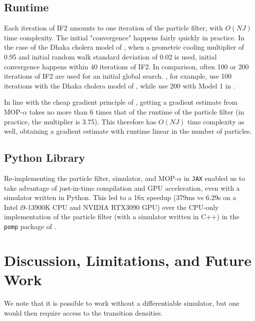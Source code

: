 \documentclass[9pt,twocolumn,twoside]{pnas-new}
\begin{document}
\subsection{Runtime}

Each iteration of IF2 amounts to one iteration of the particle filter, with $O(NJ)$ time complexity. The initial "convergence" happens fairly quickly in practice. In the case of the Dhaka cholera model of \cite{king08}, when a geometric cooling multiplier of 0.95 and initial random walk standard deviation of 0.02 is used, initial convergence happens within 40 iterations of IF2. In comparison, often 100 or 200 iterations of IF2 are used for an initial global search. \cite{ionides15}, for example, use 100 iterations with the Dhaka cholera model of \cite{king08}, while \cite{wheeler23} use 200 with Model 1 in \cite{lee20}.

In line with the cheap gradient principle of \cite{kakade2019provably}, getting a gradient estimate from MOP-$\alpha$ takes no more than 6 times that of the runtime of the particle filter (in practice, the multiplier is 3.75). This therefore has $O(NJ)$ time complexity as well, obtaining a gradient estimate with runtime linear in the number of particles.

\subsection{Python Library}

Re-implementing the particle filter, simulator, and MOP-$\alpha$ in \texttt{JAX} \cite{jax} enabled us to take advantage of just-in-time compilation and GPU acceleration, even with a simulator written in Python. This led to a 16x speedup (379ms vs 6.29s on a Intel i9-13900K CPU and NVIDIA RTX3090 GPU) over the CPU-only implementation of the particle filter (with a simulator written in C++) in the \texttt{pomp} package of \cite{king16}. 





\section{Discussion, Limitations, and Future Work}

We note that it is possible to work without a differentiable simulator, but one would then require access to the transition densities. 
\end{document}
